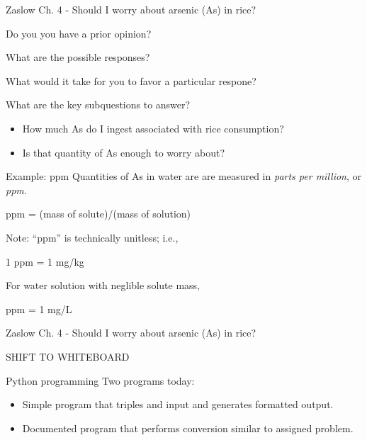 \documentclass[
  ignorenonframetext,
]{beamer}
\providecommand{\tightlist}{%
  \setlength{\itemsep}{0pt}\setlength{\parskip}{0pt}}
\begin{document}
\begin{frame}{Zaslow Ch. 4 - Should I worry about arsenic (As) in rice?}
\label{zaslow-ch.-4---should-i-worry-about-arsenic-as-in-rice}
\pause

Do you you have a prior opinion?

\pause

What are the possible responses?

\pause

What would it take for you to favor a particular respone?

\pause

What are the key subquestions to answer?

\pause

\begin{itemize}
\tightlist
\item
  How much As do I ingest associated with rice consumption?
\end{itemize}

\pause

\begin{itemize}
\tightlist
\item
  Is that quantity of As enough to worry about?
\end{itemize}
\end{frame}

\begin{frame}{Example: ppm}
\label{example-ppm}
Quantities of As in water are are measured in \emph{parts per million},
or \emph{ppm}. \pause

\begin{center}
ppm = (mass of solute)/(mass of solution)
\end{center}

\pause

Note: ``ppm'' is technically unitless; i.e.,

\begin{center}
1 ppm = 1 mg/kg
\end{center}

\pause

For water solution with neglible solute mass,

\begin{center}
ppm = 1 mg/L
\end{center}
\end{frame}

\begin{frame}{Zaslow Ch. 4 - Should I worry about arsenic (As) in rice?}
\label{zaslow-ch.-4---should-i-worry-about-arsenic-as-in-rice-1}
\centering

\LARGE  SHIFT TO WHITEBOARD
\end{frame}

\begin{frame}{Python programming}
\label{python-programming}
Two programs today:

\begin{itemize}
\item
  Simple program that triples and input and generates formatted output.
\item
  Documented program that performs conversion similar to assigned
  problem.
\end{itemize}
\end{frame}
\end{document}
